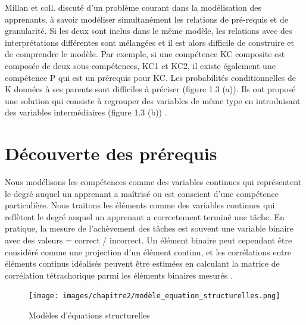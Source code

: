 Millan et coll. discuté d'un problème courant dans la modélisation des apprenants, à savoir modéliser simultanément les relations de pré-requis et de granularité. Si les deux sont inclus dans le même modèle, les relations avec des interprétations différentes sont mélangées et il est alors difficile de construire et de comprendre le modèle. Par exemple, si une compétence KC composite est composée de deux sous-compétences, KC1 et KC2, il existe également une compétence P qui est un prérequis pour KC. Les probabilités conditionnelles de K données à ses parents sont difficiles à préciser (figure 1.3 (a)). Ils ont proposé une solution qui consiste à regrouper des variables de même type en introduisant des variables intermédiaires (figure 1.3 (b)) \cite{bayesian_networks_student_model_engineering}.

\section{Découverte des prérequis}
Nous modélisons les compétences comme des variables continues qui représentent le degré auquel un apprenant a maîtrisé ou est conscient d'une compétence particulière. Nous traitons les éléments comme des variables continues qui reflètent le degré auquel un apprenant a correctement terminé une tâche. En pratique, la mesure de l'achèvement des tâches est souvent une variable binaire avec des valeurs = correct / incorrect. Un élément binaire peut cependant être considéré comme une projection d'un élément continu, et les corrélations entre éléments continus idéalisés peuvent être estimées en calculant la matrice de corrélation tétrachorique parmi les éléments binaires mesurés \cite{Discovering_Prerequisite_Relationships_among_Knowledge_Components}.

\begin{figure}[H]
	\begin{center}
		\texttt{[image: images/chapitre2/modèle\_equation\_structurelles.png]}
	\end{center}
\caption{Modèles d'équations structurelles}
\label{modeleEquation}
\end{figure}

